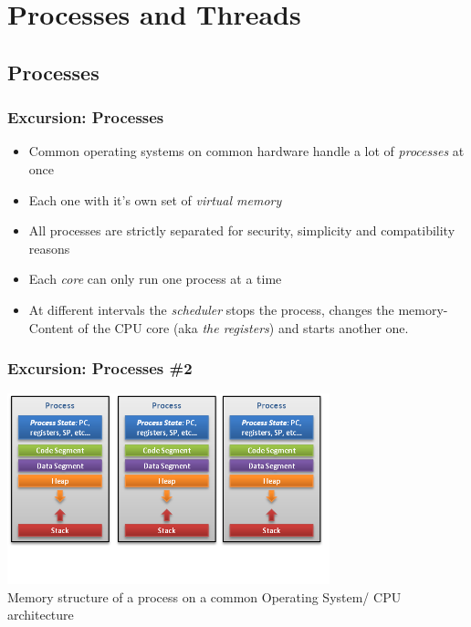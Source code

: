 \documentclass[10pt]{beamer}
\begin{document}
\section{Processes and Threads}

\subsection{Processes}

\begin{frame}
        \frametitle{Excursion: Processes}
        \begin{itemize}
                \item Common operating systems on common hardware handle a lot of \emph{processes} at once
                \item Each one with it's own set of \emph{virtual memory}
                \item All processes are strictly separated for security, simplicity and compatibility reasons
                \item Each \emph{core} can only run one process at a time
                \item At different intervals the \emph{scheduler} stops the process, changes the memory-Content of the CPU core (aka \emph{the registers}) and starts another one.
        \end{itemize}
\end{frame}


\begin{frame}
        \frametitle{Excursion: Processes \#2}
        \vspace{0.5cm}
        \includegraphics[width=0.7\textwidth]{pictures/process_no_sm.png} \\
        \vspace{-0.5cm}
        {\footnotesize \hspace{3cm}Memory structure of a process on a common Operating System/ CPU architecture}        
\end{frame}
\end{document}
